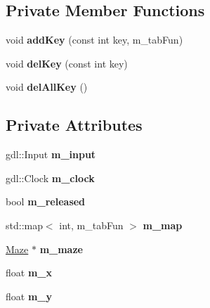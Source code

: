 \subsection*{Private Member Functions}
\begin{DoxyCompactItemize}
\item 
\hypertarget{class_game_state_a44f1c153da135cce9545d0f0657ed7a2}{}void {\bfseries add\+Key} (const int key, m\+\_\+tab\+Fun)\label{class_game_state_a44f1c153da135cce9545d0f0657ed7a2}

\item 
\hypertarget{class_game_state_a90267d8dea61676558ebf1c25fbdf3e2}{}void {\bfseries del\+Key} (const int key)\label{class_game_state_a90267d8dea61676558ebf1c25fbdf3e2}

\item 
\hypertarget{class_game_state_acefc839e2561fbeb1e82f6691ff7477a}{}void {\bfseries del\+All\+Key} ()\label{class_game_state_acefc839e2561fbeb1e82f6691ff7477a}

\end{DoxyCompactItemize}
\subsection*{Private Attributes}
\begin{DoxyCompactItemize}
\item 
\hypertarget{class_game_state_a7cad5b6e78962708b8b500f25fab69d4}{}gdl\+::\+Input {\bfseries m\+\_\+input}\label{class_game_state_a7cad5b6e78962708b8b500f25fab69d4}

\item 
\hypertarget{class_game_state_aba2c367913625cd35daa110caa48aba1}{}gdl\+::\+Clock {\bfseries m\+\_\+clock}\label{class_game_state_aba2c367913625cd35daa110caa48aba1}

\item 
\hypertarget{class_game_state_abab343813bd6c85748a34394b17cb35d}{}bool {\bfseries m\+\_\+released}\label{class_game_state_abab343813bd6c85748a34394b17cb35d}

\item 
\hypertarget{class_game_state_a978a20a8bac462168f23a1bb1a55e67b}{}std\+::map$<$ int, m\+\_\+tab\+Fun $>$ {\bfseries m\+\_\+map}\label{class_game_state_a978a20a8bac462168f23a1bb1a55e67b}

\item 
\hypertarget{class_game_state_a40afe6980605806e54c97803c8c9b4fb}{}\hyperlink{class_maze}{Maze} $\ast$ {\bfseries m\+\_\+maze}\label{class_game_state_a40afe6980605806e54c97803c8c9b4fb}

\item 
\hypertarget{class_game_state_a7eb85787fb717f6d52ad75210ed70bbb}{}float {\bfseries m\+\_\+x}\label{class_game_state_a7eb85787fb717f6d52ad75210ed70bbb}

\item 
\hypertarget{class_game_state_a9d94685dc67578d4f078577b80c94bc2}{}float {\bfseries m\+\_\+y}\label{class_game_state_a9d94685dc67578d4f078577b80c94bc2}

\end{DoxyCompactItemize}

